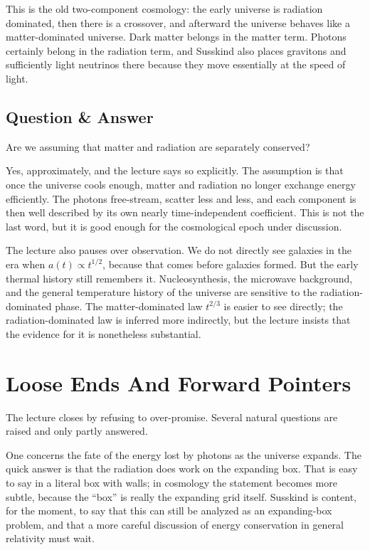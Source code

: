 This is the old two-component cosmology: the early universe is radiation dominated, then there is a crossover, and afterward the universe behaves like a matter-dominated universe. Dark matter belongs in the matter term. Photons certainly belong in the radiation term, and Susskind also places gravitons and sufficiently light neutrinos there because they move essentially at the speed of light.

\subsection{Question \& Answer}

Are we assuming that matter and radiation are separately conserved?

Yes, approximately, and the lecture says so explicitly. The assumption is that once the universe cools enough, matter and radiation no longer exchange energy efficiently. The photons free-stream, scatter less and less, and each component is then well described by its own nearly time-independent coefficient. This is not the last word, but it is good enough for the cosmological epoch under discussion.

The lecture also pauses over observation. We do not directly see galaxies in the era when \(a(t)\propto t^{1/2}\), because that comes before galaxies formed. But the early thermal history still remembers it. Nucleosynthesis, the microwave background, and the general temperature history of the universe are sensitive to the radiation-dominated phase. The matter-dominated law \(t^{2/3}\) is easier to see directly; the radiation-dominated law is inferred more indirectly, but the lecture insists that the evidence for it is nonetheless substantial.

\section{Loose Ends And Forward Pointers}

The lecture closes by refusing to over-promise. Several natural questions are raised and only partly answered.

One concerns the fate of the energy lost by photons as the universe expands. The quick answer is that the radiation does work on the expanding box. That is easy to say in a literal box with walls; in cosmology the statement becomes more subtle, because the ``box'' is really the expanding grid itself. Susskind is content, for the moment, to say that this can still be analyzed as an expanding-box problem, and that a more careful discussion of energy conservation in general relativity must wait.

